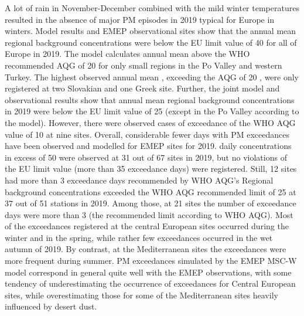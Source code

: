 A lot of rain in November-December combined with the mild winter temperatures resulted in the absence of major PM episodes in 2019 typical for Europe in winters. Model results and EMEP observational sites show that the annual mean regional background \PM[10] concentrations were below the EU limit value of 40 \ug for all of Europe in 2019. The model calculates annual mean \PM[10] above the WHO recommended AQG of 20 \ug for only small regions in the Po Valley and western Turkey. The highest observed annual mean \PM[10], exceeding the AQG of 20 \ug, were only registered at two Slovakian and one Greek site. Further, the joint model and observational results show that annual mean regional background \PM[2.5] concentrations in 2019 were below the EU limit value of 25 \ug (except in the Po Valley according to the model). However, there were observed cases of exceedance of the WHO AQG value of 10 \ug at nine sites.
Overall, considerable fewer days with PM exceedances have been observed and modelled for EMEP sites for 2019. \PM[10] daily concentrations in excess of 50 \ug were observed at 31 out of 67 sites in 2019, but no violations of the \PM[10] EU limit value (more than 35 exceedance days) were registered. Still, 12 sites had more than 3 exceedance days recommended by WHO AQG’s %
Regional background \PM[2.5] concentrations exceeded the WHO AQG recommended limit of 25 \ug at 37 out of 51 stations in 2019. Among those, at 21 sites the number of exceedance days were more than 3 (the recommended limit according to WHO AQG).  %
Most of the exceedances registered at the central European sites occurred during the winter and in the spring, while rather few exceedances occurred in the wet autumn of 2019. By contrast, at the Mediterranean sites the exceedances were more frequent during summer. PM exceedances simulated by the EMEP MSC-W model correspond in general quite well with the EMEP observations, with some tendency of underestimating the occurrence of exceedances for Central European sites, while overestimating those for some of the Mediterranean sites heavily influenced by desert dust.



